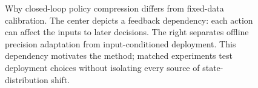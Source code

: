 \begin{figure}[t]
  \centering
  \hfill
  \hfill
  \caption{Why closed-loop policy compression differs from fixed-data calibration. The center depicts a feedback dependency: each action can affect the inputs to later decisions. The right separates offline precision adaptation from input-conditioned deployment. This dependency motivates the method; matched experiments test deployment choices without isolating every source of state-distribution shift.}
  \label{fig:pipeline}
\end{figure}